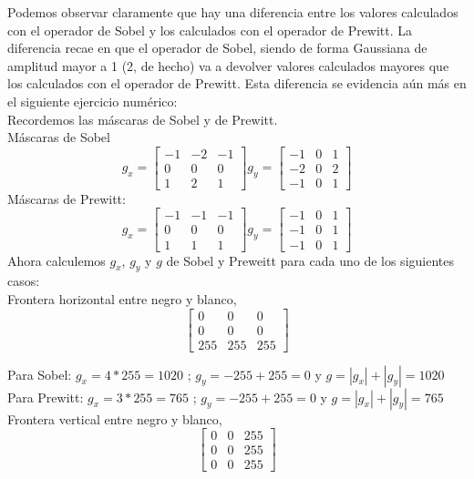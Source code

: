 \documentclass{article}
\begin{document}
Podemos observar claramente que hay una diferencia entre los valores calculados con el
operador de Sobel y los calculados con el operador de Prewitt. La diferencia recae en que el
operador de Sobel, siendo de forma Gaussiana de amplitud mayor a 1 (2, de hecho) va a
devolver valores calculados mayores que los calculados con el operador de Prewitt. Esta
diferencia se evidencia aún más en el siguiente ejercicio numérico:\\

Recordemos las máscaras de Sobel y de Prewitt.\\
Máscaras de Sobel
\[
g_x = 
\begin{bmatrix}
    -1 & -2 & -1\\
    0 & 0 & 0 \\
    1 & 2 & 1 
\end{bmatrix}
g_y = 
\begin{bmatrix}
    -1 & 0 & 1\\
    -2 & 0 & 2 \\
    -1 & 0 & 1 
\end{bmatrix}
\]
Máscaras de Prewitt:\\
\[
g_x = 
\begin{bmatrix}
    -1 & -1 & -1\\
    0 & 0 & 0 \\
    1 & 1 & 1 
\end{bmatrix}
g_y = 
\begin{bmatrix}
    -1 & 0 & 1\\
    -1 & 0 & 1 \\
    -1 & 0 & 1 
\end{bmatrix}
\]
Ahora calculemos $g_x$, $g_y$ y $g$ de Sobel y Preweitt para cada uno de los siguientes casos:\\
Frontera horizontal entre negro y blanco, 
\[ 
\begin{bmatrix}
    0 & 0 & 0\\
    0 & 0 & 0 \\
    255 & 255 & 255 
\end{bmatrix} 
\]

Para Sobel:
$
g_x = 4 * 255 = 1020
$
; 
$
g_y = - 255 + 255 = 0
$
 y 
$
g = |g_x| + |g_y| = 1020
$
\\
Para Prewitt:
$
g_x = 3 * 255 = 765
$
; 
$
g_y = - 255 + 255 = 0
$
 y 
$
g  = |g_x| + |g_y| = 765
$
\\

Frontera vertical entre negro y blanco, 
\[ 
\begin{bmatrix}
    0 & 0 & 255\\
    0 & 0 & 255 \\
    0 & 0 & 255 
\end{bmatrix} 
\]
\end{document}
